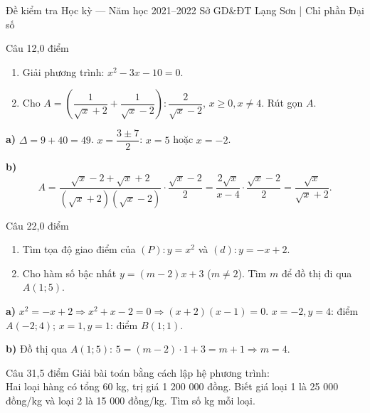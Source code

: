 ﻿%
%
  {Đề kiểm tra Học kỳ — Năm học 2021--2022}%
  {Sở GD\&ĐT Lạng Sơn | Chỉ phần Đại số}

\begin{de_cau}{Câu 1}{2,0 điểm}
\begin{enumerate}[label=\alph*)]
\item Giải phương trình: $x^2 - 3x - 10 = 0$.
\item Cho $A=\left(\dfrac{1}{\sqrt{x}+2}+\dfrac{1}{\sqrt{x}-2}\right):\dfrac{2}{\sqrt{x}-2}$, $x\geq 0, x\neq 4$.
Rút gọn $A$.
\end{enumerate}
\end{de_cau}

\begin{loi_giai_cau}
\textbf{a)} $\Delta=9+40=49$. $x=\dfrac{3\pm 7}{2}$: $x=5$ hoặc $x=-2$.

\textbf{b)}
\[A=\frac{\sqrt{x}-2+\sqrt{x}+2}{(\sqrt{x}+2)(\sqrt{x}-2)}\cdot\frac{\sqrt{x}-2}{2}
=\frac{2\sqrt{x}}{x-4}\cdot\frac{\sqrt{x}-2}{2}=\frac{\sqrt{x}}{\sqrt{x}+2}.\]
\end{loi_giai_cau}

\begin{de_cau}{Câu 2}{2,0 điểm}
\begin{enumerate}[label=\alph*)]
\item Tìm tọa độ giao điểm của $(P)\colon y=x^2$ và $(d)\colon y=-x+2$.
\item Cho hàm số bậc nhất $y=(m-2)x+3$ ($m\neq 2$). Tìm $m$ để đồ thị đi qua $A(1;5)$.
\end{enumerate}
\end{de_cau}

\begin{loi_giai_cau}
\textbf{a)} $x^2=-x+2\Rightarrow x^2+x-2=0\Rightarrow(x+2)(x-1)=0$.
$x=-2,y=4$: điểm $A(-2;4)$; $x=1,y=1$: điểm $B(1;1)$.

\textbf{b)} Đồ thị qua $A(1;5)$: $5=(m-2)\cdot 1+3=m+1\Rightarrow m=4$.
\end{loi_giai_cau}

\begin{de_cau}{Câu 3}{1,5 điểm}
Giải bài toán bằng cách lập hệ phương trình:\\
Hai loại hàng có tổng 60 kg, trị giá 1 200 000 đồng. Biết giá loại 1 là 25 000 đồng/kg và loại 2 là
15 000 đồng/kg. Tìm số kg mỗi loại.
\end{de_cau}

